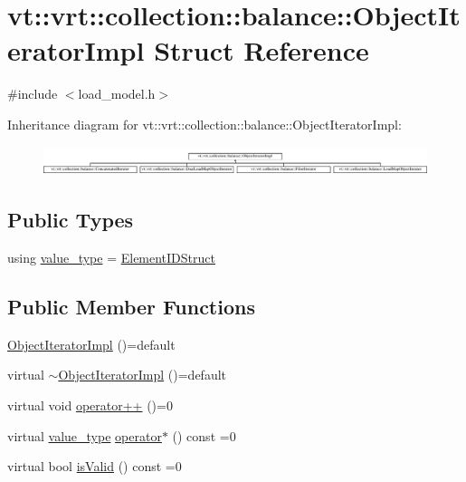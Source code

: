 \hypertarget{structvt_1_1vrt_1_1collection_1_1balance_1_1_object_iterator_impl}{}\section{vt\+:\+:vrt\+:\+:collection\+:\+:balance\+:\+:Object\+Iterator\+Impl Struct Reference}
\label{structvt_1_1vrt_1_1collection_1_1balance_1_1_object_iterator_impl}


{\ttfamily \#include $<$load\+\_\+model.\+h$>$}

Inheritance diagram for vt\+:\+:vrt\+:\+:collection\+:\+:balance\+:\+:Object\+Iterator\+Impl\+:\begin{figure}[H]
\begin{center}
\leavevmode
\includegraphics[height=0.864197cm]{structvt_1_1vrt_1_1collection_1_1balance_1_1_object_iterator_impl}
\end{center}
\end{figure}
\subsection*{Public Types}
\begin{DoxyCompactItemize}
\item 
using \hyperlink{structvt_1_1vrt_1_1collection_1_1balance_1_1_object_iterator_impl_a8a38ab2c722e341d729f61cb59112376}{value\+\_\+type} = \hyperlink{namespacevt_1_1vrt_1_1collection_1_1balance_a9f5b53fafb270212279a4757d2c4cd28}{Element\+I\+D\+Struct}
\end{DoxyCompactItemize}
\subsection*{Public Member Functions}
\begin{DoxyCompactItemize}
\item 
\hyperlink{structvt_1_1vrt_1_1collection_1_1balance_1_1_object_iterator_impl_a808e1d2a3427a4c9ed86ecafc28edd41}{Object\+Iterator\+Impl} ()=default
\item 
virtual \hyperlink{structvt_1_1vrt_1_1collection_1_1balance_1_1_object_iterator_impl_ab71847f88423abc159bf0d53ace9474b}{$\sim$\+Object\+Iterator\+Impl} ()=default
\item 
virtual void \hyperlink{structvt_1_1vrt_1_1collection_1_1balance_1_1_object_iterator_impl_ab59b65c6a22626b6d2d3ab283309ac1f}{operator++} ()=0
\item 
virtual \hyperlink{structvt_1_1vrt_1_1collection_1_1balance_1_1_object_iterator_impl_a8a38ab2c722e341d729f61cb59112376}{value\+\_\+type} \hyperlink{structvt_1_1vrt_1_1collection_1_1balance_1_1_object_iterator_impl_a361451a08b7d2361ee9f0e5b3c35c089}{operator$\ast$} () const =0
\item 
virtual bool \hyperlink{structvt_1_1vrt_1_1collection_1_1balance_1_1_object_iterator_impl_a16b8504d1abff325f65ce29513792386}{is\+Valid} () const =0
\end{DoxyCompactItemize}


